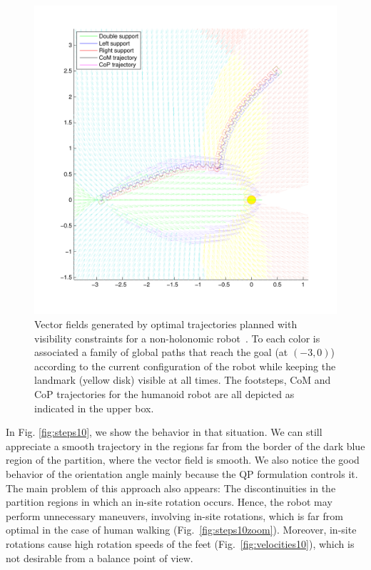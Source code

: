 \begin{figure}[ht]
\centering
\includegraphics[scale=0.8]{Chap5-Visual-Planning/steps6.pdf}
\caption{Vector fields generated by optimal trajectories planned with visibility constraints for a non-holonomic robot~\cite{Salaris:2010}. To each color is associated a family of global paths that reach the goal (at $(-3,0)$) according to the current configuration of the robot while keeping the landmark (yellow disk) visible at all times. The footsteps, CoM and CoP trajectories for the humanoid robot are all depicted as indicated in the upper box.}
\label{fig:steps6}
\end{figure}

In Fig. \ref{fig:steps10}, we show the behavior in that situation. We can still appreciate a smooth trajectory in the regions far from the border of the dark blue region of the partition, where the vector field is smooth. We also notice the good behavior of the orientation angle mainly because the QP formulation controls it. The main problem of this approach also appears: The discontinuities in the partition regions in which an in-site rotation occurs. Hence, the robot may perform unnecessary maneuvers, involving in-site rotations, which is far from optimal in the case of human walking (Fig.~\ref{fig:steps10zoom}). Moreover, in-site rotations cause high rotation speeds of the feet (Fig.~\ref{fig:velocities10}), which is not desirable from a balance point of view.

